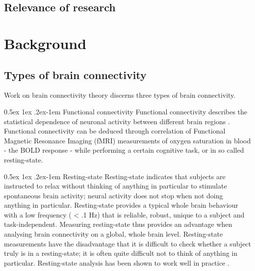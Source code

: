 \documentclass[a4paper, 10pt, english, onecolumn]{article}
\makeatletter
\renewcommand{\paragraph}{%
  \@startsection{paragraph}{4}%
  {\z@}{0.5ex \@plus 1ex \@minus .2ex}{-1em}%
  {\normalfont\normalsize\bfseries}%
}
\makeatother
\begin{document}
\subsection{Relevance of research}

\section{Background}
\subsection{Types of brain connectivity}
Work on brain connectivity theory discerns three types of brain connectivity.

\paragraph{Functional connectivity}
Functional connectivity describes the statistical dependence of neuronal activity between different brain regions \cite{friston1993functional}.
Functional connectivity can be deduced through correlation of Functional Magnetic Resonance Imaging (fMRI) measurements of oxygen saturation  in blood - the BOLD response - while performing a certain cognitive task, or in so called resting-state.

\paragraph{Resting-state}
Resting-state indicates that subjects are instructed to relax without thinking of anything in particular to stimulate spontaneous brain activity; neural activity does not stop when not doing anything in particular.
Resting-state provides a typical whole brain behaviour with a low frequency ( < .1 Hz) that is reliable, robust, unique to a subject and task-independent.
Measuring resting-state thus provides an advantage when analysing brain connectivity on a global, whole brain level.
Resting-state measurements have the disadvantage that it is difficult to check whether a subject truly is in a resting-state; it is often quite difficult not to think of anything in particular.
Resting-state analysis has been shown to work well in practice \cite{Lowe2000, doria2010, Bullmore2009}.
\end{document}
